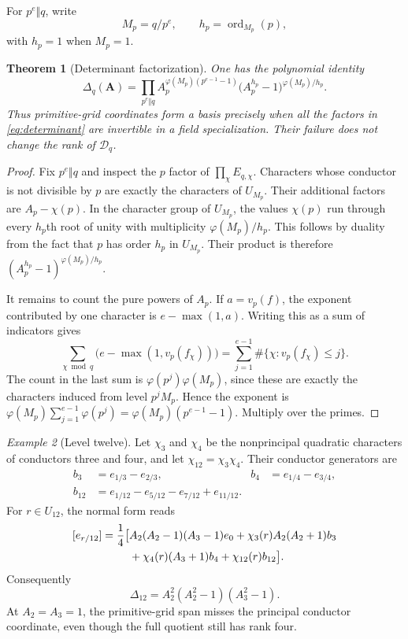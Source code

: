 \documentclass[11pt]{article}
\numberwithin{equation}{section}
\newtheorem{theorem}{Theorem}[section]
\theoremstyle{definition}
\theoremstyle{remark}
\newtheorem{example}[theorem]{Example}
\DeclareMathOperator{\ord}{ord}
\newcommand{\D}{\mathcal D}
\begin{document}
For $p^e\Vert q$, write
\[
 M_p=q/p^e,\qquad h_p=\ord_{M_p}(p),
\]
with $h_p=1$ when $M_p=1$.

\begin{theorem}[Determinant factorization]\label{thm:determinant}
One has the polynomial identity
\begin{equation}\label{eq:determinant}
 \boxed{\displaystyle
 \Delta_q(\mathbf A)=
 \prod_{p^e\Vert q}
 A_p^{\varphi(M_p)(p^{e-1}-1)}
 \bigl(A_p^{h_p}-1\bigr)^{\varphi(M_p)/h_p}.}
\end{equation}
Thus primitive-grid coordinates form a basis precisely when all the
factors in \eqref{eq:determinant} are invertible in a field
specialization. Their failure does not change the rank of $\D_q$.
\end{theorem}
\begin{proof}
Fix $p^e\Vert q$ and inspect the $p$ factor of
$\prod_\chi E_{q,\chi}$. Characters whose conductor is not divisible by
$p$ are exactly the characters of $U_{M_p}$. Their additional factors
are $A_p-\chi(p)$. In the character group of $U_{M_p}$, the values
$\chi(p)$ run through every $h_p$th root of unity with multiplicity
$\varphi(M_p)/h_p$. This follows by duality from the fact that $p$ has
order $h_p$ in $U_{M_p}$. Their product is therefore
$(A_p^{h_p}-1)^{\varphi(M_p)/h_p}$.

It remains to count the pure powers of $A_p$. If $a=v_p(f)$, the
exponent contributed by one character is $e-\max(1,a)$. Writing this
as a sum of indicators gives
\[
 \sum_{\chi\bmod q}\bigl(e-\max(1,v_p(f_\chi))\bigr)
 =\sum_{j=1}^{e-1}\#\{\chi:v_p(f_\chi)\le j\}.
\]
The count in the last sum is $\varphi(p^j)\varphi(M_p)$, since these
are exactly the characters induced from level $p^jM_p$. Hence the
exponent is
$\varphi(M_p)\sum_{j=1}^{e-1}\varphi(p^j)
=\varphi(M_p)(p^{e-1}-1)$. Multiply over the primes.
\end{proof}

\begin{example}[Level twelve]
Let $\chi_3$ and $\chi_4$ be the nonprincipal quadratic characters of
conductors three and four, and let $\chi_{12}=\chi_3\chi_4$.
Their conductor generators are
\begin{align*}
 b_3&=e_{1/3}-e_{2/3},&
 b_4&=e_{1/4}-e_{3/4},\\
 b_{12}&=e_{1/12}-e_{5/12}-e_{7/12}+e_{11/12}.
\end{align*}
For $r\in U_{12}$, the normal form reads
\begin{align}\label{eq:q12-normal}
 [e_{r/12}]=\frac14\bigl[&A_2(A_2-1)(A_3-1)e_0
 +\chi_3(r)A_2(A_2+1)b_3\notag\\
 &+\chi_4(r)(A_3+1)b_4+\chi_{12}(r)b_{12}\bigr].
\end{align}
Consequently
\[
 \Delta_{12}=A_2^2(A_2^2-1)(A_3^2-1).
\]
At $A_2=A_3=1$, the primitive-grid span misses the principal conductor
coordinate, even though the full quotient still has rank four.
\end{example}
\end{document}
